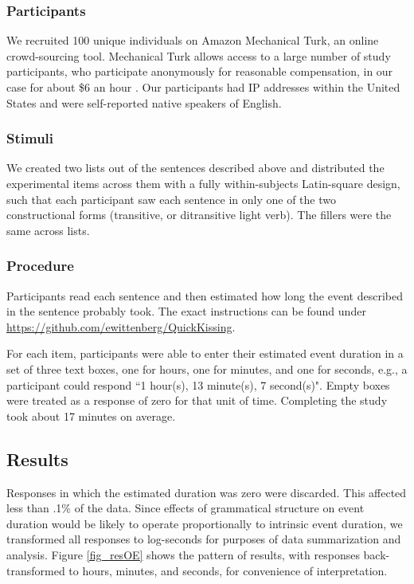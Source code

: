 \documentclass[review,12pt,authoryear]{elsarticle}
\newcommand*{\sectionformat}{\centering}
\begin{document}
\subsubsection*{Participants} \label{sec_partOE}
We recruited 100 unique individuals on Amazon Mechanical Turk, an online
crowd-sourcing tool. Mechanical Turk allows access to a large number of study participants, who participate anonymously for reasonable compensation, in our case for about \$6 an hour \citep{buhrmester2011amazon,crump2013evaluating}. Our participants had IP addresses within the United States and were self-reported native speakers of English.

\subsubsection*{Stimuli}\label{sec_stimOE}
We created two lists out of the sentences described above and distributed the experimental items across them with a fully within-subjects Latin-square design, such that each participant saw each sentence in only one of the two constructional forms (transitive, or ditransitive light verb). The fillers were the same across lists.

\subsubsection*{Procedure}\label{sec_procOE}
Participants read each sentence and then estimated how long the event described in the sentence probably took. The exact instructions can be found under \url{https://github.com/ewittenberg/QuickKissing}.

For each item, participants were able to enter their estimated event duration in a set of three text boxes, one for hours, one for minutes, and one for seconds, e.g., a participant could respond ``1 hour(s), 13 minute(s), 7 second(s)". Empty boxes were treated as a response of zero for that unit of time. Completing the study took about 17 minutes on average.

\subsection*{\sectionformat Results}\label{sec_resOE}
Responses in which the estimated duration was zero were discarded. This affected less than .1\% of the data. Since effects of grammatical structure on event duration would be likely to operate proportionally to intrinsic event duration, we transformed all responses to log-seconds for purposes of data summarization and analysis. Figure \ref{fig_resOE} shows the pattern of results, with responses back-transformed to hours, minutes, and seconds, for convenience of interpretation. 
\end{document}
